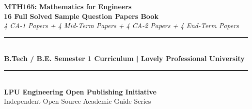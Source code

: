 \begin{titlepage}
\centering
\vspace*{1.5cm}
{\Huge \textbf{\color{LPUNavy}MTH165: Mathematics for Engineers}}\\[0.5cm]
{\LARGE \textbf{\color{LPUOrange}16 Full Solved Sample Question Papers Book}}\\[0.3cm]
{\large \textit{4 CA-1 Papers + 4 Mid-Term Papers + 4 CA-2 Papers + 4 End-Term Papers}}\\[2cm]

\rule{\linewidth}{1.5pt}\\[0.5cm]
{\large \textbf{B.Tech / B.E. Semester 1 Curriculum | Lovely Professional University}}\\[0.5cm]
\rule{\linewidth}{1.5pt}\\[2.5cm]

\vfill
{\large \textbf{LPU Engineering Open Publishing Initiative}}\\[0.2cm]
{\small Independent Open-Source Academic Guide Series}
\end{titlepage}
\newpage
